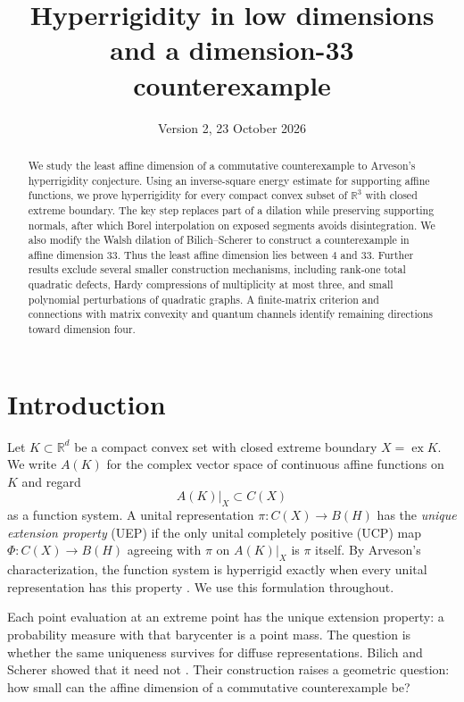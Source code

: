 \documentclass[11pt,letterpaper]{amsart}
\title[Hyperrigidity in low dimensions]{Hyperrigidity in low dimensions\\and a dimension-33 counterexample}
\date{Version 2, 23 October 2026}
\theoremstyle{definition}
\theoremstyle{remark}
\numberwithin{equation}{section}
\DeclareMathOperator{\ex}{ex}
\newcommand{\R}{\mathbb R}
\begin{document}
\begin{abstract}
We study the least affine dimension of a commutative counterexample to
Arveson's hyperrigidity conjecture. Using an inverse-square energy
estimate for supporting affine functions, we prove hyperrigidity for
every compact convex subset of $\R^3$ with closed extreme boundary.
The key step replaces part of a dilation while preserving supporting
normals, after which Borel interpolation on exposed segments avoids
disintegration. We also modify the Walsh dilation of Bilich--Scherer to
construct a counterexample in affine dimension $33$. Thus the least
affine dimension lies between $4$ and $33$. Further results exclude
several smaller construction mechanisms, including rank-one total
quadratic defects, Hardy compressions of multiplicity at most three,
and small polynomial perturbations of quadratic graphs. A finite-matrix
criterion and connections with matrix convexity and quantum channels
identify remaining directions toward dimension four.
\end{abstract}
\maketitle

\section{Introduction}
\label{sec:introduction}

Let $K\subset\R^d$ be a compact convex set with closed extreme boundary
$X=\ex K$. We write $A(K)$ for the complex vector space of continuous
affine functions on $K$ and regard
\[
                         A(K)|_X\subset C(X)
\]
as a function system. A unital representation $\pi:C(X)\to B(H)$ has
the \emph{unique extension property} (UEP) if the only unital completely
positive (UCP) map $\Phi:C(X)\to B(H)$ agreeing with $\pi$ on $A(K)|_X$ is
$\pi$ itself. By Arveson's characterization, the function system is
hyperrigid exactly when every unital representation has this property
\cite{Arv}. We use this formulation throughout.

Each point evaluation at an extreme point has the unique extension
property: a probability measure with that barycenter is a point mass.
The question is whether the same uniqueness survives for diffuse
representations. Bilich and Scherer showed that it need not
\cite{BS}. Their construction raises a geometric question: how small
can the affine dimension of a commutative counterexample be?
\end{document}
